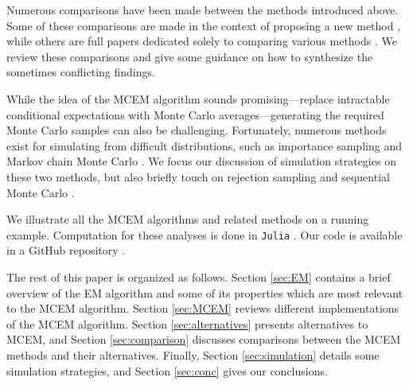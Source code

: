 \documentclass[11pt, oneside]{article}   	%
\begin{document}
Numerous comparisons have been made between the methods introduced above. Some of these comparisons are made in the context of proposing a new method \citep[e.g.,][]{Gu98I,Boo99}, while others are full papers dedicated solely to comparing various methods \citep{McC97,Boo01}. We review these comparisons and give some guidance on how to synthesize the sometimes conflicting findings. 

While the idea of the MCEM algorithm sounds promising---replace intractable conditional expectations with Monte Carlo averages---generating the required Monte Carlo samples can also be challenging. Fortunately, numerous methods exist for simulating from difficult distributions, such as importance sampling \citep{Rob04} and Markov chain Monte Carlo \citep{Gel13}. We focus our discussion of simulation strategies on these two methods, but also briefly touch on rejection sampling \citep{Cho20} and sequential Monte Carlo \citep{Del06}.


We illustrate all the MCEM algorithms and related methods on a running example. Computation for these analyses is done in \texttt{Julia} \citep{Bez17}. Our code is available in a GitHub repository \citep{Rut23I}.

The rest of this paper is organized as follows. Section \ref{sec:EM} contains a brief overview of the EM algorithm and some of its properties which are most relevant to the MCEM algorithm. Section \ref{sec:MCEM} reviews different implementations of the MCEM algorithm. Section \ref{sec:alternatives} presents alternatives to MCEM, and Section \ref{sec:comparison} discusses comparisons between the MCEM methods and their alternatives. Finally, Section \ref{sec:simulation} details some simulation strategies, and Section \ref{sec:conc} gives our conclusions.
\end{document}

